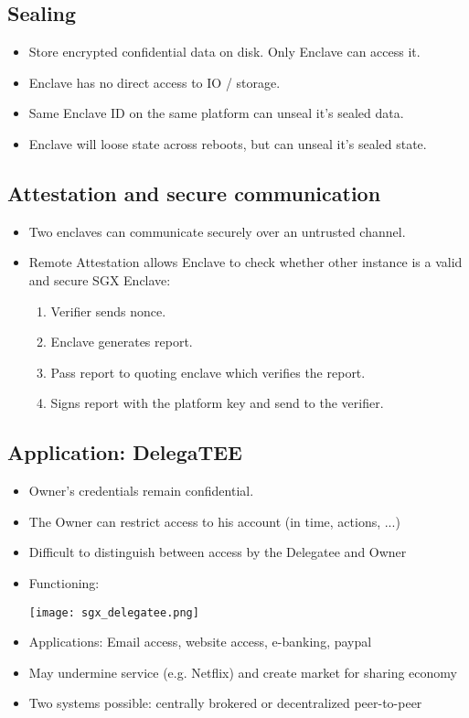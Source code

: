 \subsection{Sealing}
\begin{itemize}
  \item Store encrypted confidential data on disk. Only Enclave can access it.
  \item Enclave has no direct access to IO / storage.
  \item Same Enclave ID on the same platform can unseal it's sealed data.
  \item Enclave will loose state across reboots, but can unseal it's sealed
    state.
\end{itemize}


\subsection{Attestation and secure communication}
\begin{itemize}
  \item Two enclaves can communicate securely over an untrusted channel.
  \item Remote Attestation allows Enclave to check whether other instance is a
    valid and secure SGX Enclave:
    \begin{enumerate}
      \item Verifier sends nonce.
      \item Enclave generates report.
      \item Pass report to quoting enclave which verifies the report.
      \item Signs report with the platform key and send to the verifier.
    \end{enumerate}
\end{itemize}

\subsection{Application: DelegaTEE}
\begin{itemize}
  \item Owner's credentials remain confidential.
  \item The Owner can restrict access to his account (in time, actions,
    ...)
  \item Difficult to distinguish between access by the
    Delegatee and Owner
  \item Functioning:
    \begin{center}
      \texttt{[image: sgx\_delegatee.png]}
    \end{center}
  \item Applications: Email access, website access, e-banking, paypal
  \item May undermine service (e.g. Netflix) and create market for sharing
    economy
  \item Two systems possible: centrally brokered or decentralized
    peer-to-peer
\end{itemize}

